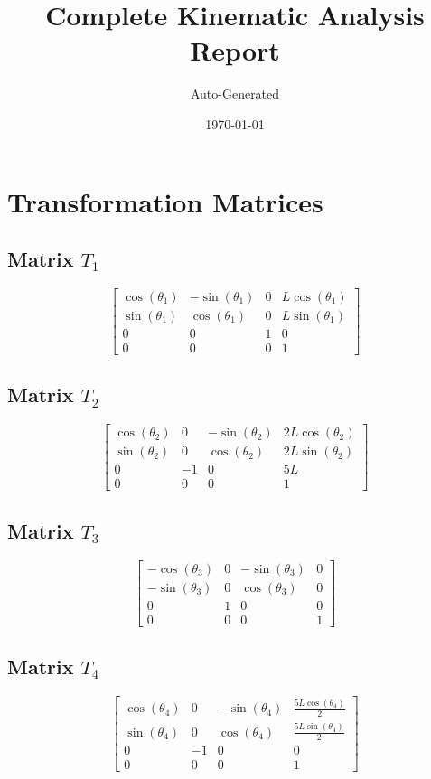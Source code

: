 \documentclass[12pt, a4paper]{article}
\title{\textbf{Complete Kinematic Analysis Report}}
\author{Auto-Generated}
\date{\today}
\begin{document}
\maketitle
\tableofcontents
\newpage
\section{Transformation Matrices}
\subsection*{Matrix $T_{1}$}
\[ \left[\begin{matrix}\cos{\left(\theta_{1} \right)} & - \sin{\left(\theta_{1} \right)} & 0 & L \cos{\left(\theta_{1} \right)}\\\sin{\left(\theta_{1} \right)} & \cos{\left(\theta_{1} \right)} & 0 & L \sin{\left(\theta_{1} \right)}\\0 & 0 & 1 & 0\\0 & 0 & 0 & 1\end{matrix}\right] \]
\subsection*{Matrix $T_{2}$}
\[ \left[\begin{matrix}\cos{\left(\theta_{2} \right)} & 0 & - \sin{\left(\theta_{2} \right)} & 2 L \cos{\left(\theta_{2} \right)}\\\sin{\left(\theta_{2} \right)} & 0 & \cos{\left(\theta_{2} \right)} & 2 L \sin{\left(\theta_{2} \right)}\\0 & -1 & 0 & 5 L\\0 & 0 & 0 & 1\end{matrix}\right] \]
\subsection*{Matrix $T_{3}$}
\[ \left[\begin{matrix}- \cos{\left(\theta_{3} \right)} & 0 & - \sin{\left(\theta_{3} \right)} & 0\\- \sin{\left(\theta_{3} \right)} & 0 & \cos{\left(\theta_{3} \right)} & 0\\0 & 1 & 0 & 0\\0 & 0 & 0 & 1\end{matrix}\right] \]
\subsection*{Matrix $T_{4}$}
\[ \left[\begin{matrix}\cos{\left(\theta_{4} \right)} & 0 & - \sin{\left(\theta_{4} \right)} & \frac{5 L \cos{\left(\theta_{4} \right)}}{2}\\\sin{\left(\theta_{4} \right)} & 0 & \cos{\left(\theta_{4} \right)} & \frac{5 L \sin{\left(\theta_{4} \right)}}{2}\\0 & -1 & 0 & 0\\0 & 0 & 0 & 1\end{matrix}\right] \]
\end{document}
